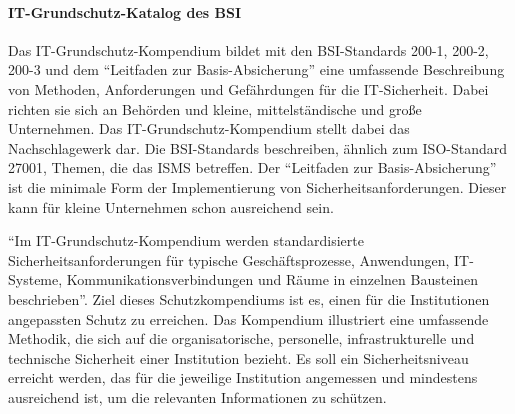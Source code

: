 \paragraph{IT-Grundschutz-Katalog des \ac{BSI}}
Das IT-Grundschutz-Kompendium bildet mit den BSI-Standards 200-1, 200-2, 200-3 und dem \enquote{Leitfaden zur Basis-Absicherung} eine umfassende Beschreibung von Methoden, Anforderungen und Gefährdungen für die IT-Sicherheit. Dabei richten sie sich an Behörden und kleine, mittelständische und große Unternehmen.\autocite[vgl.][S.\,3]{bundesamt_fur_sicherheit_in_der_informationstechnik_bsi_it-grundschutz-kompendium_2020} Das IT-Grundschutz-Kompendium stellt dabei das Nachschlagewerk dar. Die BSI-Standards beschreiben, ähnlich zum ISO-Standard 27001, Themen, die das \ac{ISMS} betreffen. Der \enquote{Leitfaden zur Basis-Absicherung} ist die minimale Form der Implementierung von Sicherheitsanforderungen. Dieser kann für kleine Unternehmen schon ausreichend sein.\autocite[vgl.][S.\,5]{bundesamt_fur_sicherheit_in_der_informationstechnik_bsi_leitfaden_2017}
\par
\enquote{Im IT-Grundschutz-Kompendium werden standardisierte Sicherheitsanforderungen für typische Geschäftsprozesse, Anwendungen, IT-Systeme, Kommunikationsverbindungen und Räume in einzelnen Bausteinen beschrieben}.\autocite[][S.\,2]{bundesamt_fur_sicherheit_in_der_informationstechnik_bsi_it-grundschutz-kompendium_2020} Ziel dieses Schutzkompendiums ist es, einen für die Institutionen angepassten Schutz zu erreichen. Das Kompendium illustriert eine umfassende Methodik, die sich auf die organisatorische, personelle, infrastrukturelle und technische Sicherheit einer Institution bezieht. Es soll ein Sicherheitsniveau erreicht werden, das für die jeweilige Institution angemessen und mindestens ausreichend ist, um die relevanten Informationen zu schützen. 
